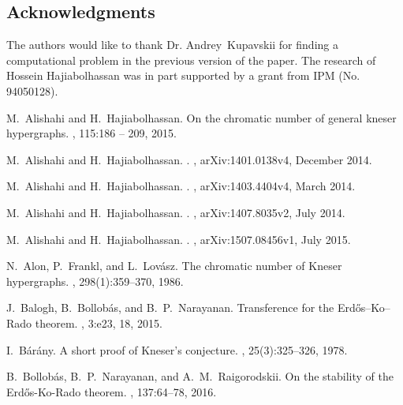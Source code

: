 \documentclass[11pt]{amsart}
\theoremstyle{definition}
\theoremstyle{remark}
\begin{document}
\subsection*{Acknowledgments} 
The authors would like to thank Dr. Andrey~Kupavskii for finding a computational problem in the previous version of the paper. 
The research of Hossein Hajiabolhassan was in part supported by a grant from IPM (No. 94050128).  
\def\cprime{$'$} \def\cprime{$'$}
\begin{thebibliography}{10}

M.~Alishahi and H.~Hajiabolhassan.
\newblock On the chromatic number of general kneser hypergraphs.
, 115:186 -- 209,
  2015.

M.~{Alishahi} and H.~{Hajiabolhassan}.
.
, arXiv:1401.0138v4, December 2014.

M.~{Alishahi} and H.~{Hajiabolhassan}.
.
, arXiv:1403.4404v4, March 2014.

M.~{Alishahi} and H.~{Hajiabolhassan}.
.
, arXiv:1407.8035v2, July 2014.

M.~{Alishahi} and H.~{Hajiabolhassan}.
.
, arXiv:1507.08456v1, July 2015.

N.~Alon, P.~Frankl, and L.~Lov{\'a}sz.
\newblock The chromatic number of {K}neser hypergraphs.
, 298(1):359--370, 1986.

J.~Balogh, B.~Bollob{\'a}s, and B.~P.~Narayanan.
\newblock Transference for the {E}rd{\H o}s--{K}o--{R}ado theorem.
, 3:e23, 18, 2015.

I.~B{\'a}r{\'a}ny.
\newblock A short proof of {K}neser's conjecture.
, 25(3):325--326, 1978.

B.~Bollob{\'a}s, B.~P.~Narayanan, and A.~M.~Raigorodskii.
\newblock On the stability of the {E}rd{\H o}s-{K}o-{R}ado theorem.
, 137:64--78, 2016.


\end{thebibliography}
\end{document}
